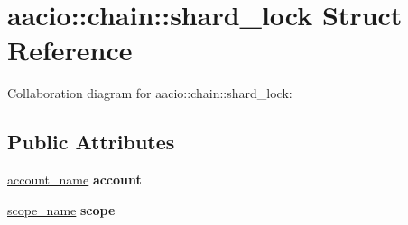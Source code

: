\hypertarget{structaacio_1_1chain_1_1shard__lock}{}\section{aacio\+:\+:chain\+:\+:shard\+\_\+lock Struct Reference}
\label{structaacio_1_1chain_1_1shard__lock}


Collaboration diagram for aacio\+:\+:chain\+:\+:shard\+\_\+lock\+:
\subsection*{Public Attributes}
\begin{DoxyCompactItemize}
\item 
\mbox{\label{structaacio_1_1chain_1_1shard__lock_a39006a0e8dc80cde97f0d77583036806}} 
\mbox{\hyperlink{structaacio_1_1chain_1_1name}{account\+\_\+name}} {\bfseries account}
\item 
\mbox{\label{structaacio_1_1chain_1_1shard__lock_a64dfcf0fa1de294cdf26568ace84998b}} 
\mbox{\hyperlink{structaacio_1_1chain_1_1name}{scope\+\_\+name}} {\bfseries scope}
\end{DoxyCompactItemize}
